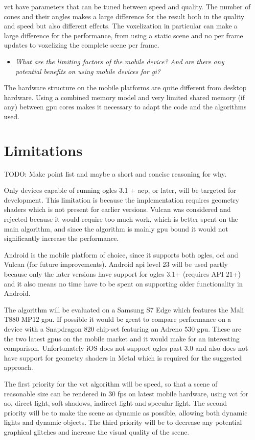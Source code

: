 \gls{vct} have parameters that can be tuned between speed and quality. 
The number of cones and their angles makes a large difference for the result both in the quality and speed but also different effects. 
The voxelization in particular can make a large difference for the performance, from using a static scene and no per frame updates to voxelizing the complete scene per frame.

\begin{itemize}
  \item \textit{What are the limiting factors of the mobile device? And are there any potential benefits on using mobile devices for \gls{gi}?}
\end{itemize}

The hardware structure on the mobile platforms are quite different from desktop hardware. 
Using a combined memory model and very limited shared memory (if any) between \gls{gpu} cores makes it necessary to adapt the code and the algorithms used.

\section{Limitations}

TODO: Make point list and maybe a short and concise reasoning for why.

Only devices capable of running \gls{ogles} 3.1 + \gls{aep}, or later, will be targeted for development. This limitation is because the implementation requires geometry shaders which is not present for earlier versions. 
Vulcan was considered and rejected because it would require too much work, which is better spent on the main algorithm, and since the algorithm is mainly \gls{gpu} bound it would not significantly increase the performance.

Android is the mobile platform of choice, since it supports both \gls{ogles}, \gls{ocl} and Vulcan (for future improvements). 
Android \acrshort{api} level 23 will be used partly because only the later versions have support for \gls{ogles} 3.1+ (requires API 21+) and it also means no time have to be spent on supporting older functionality in Android.

The algorithm will be evaluated on a Samsung S7 Edge which features the Mali T880 MP12 \gls{gpu}. 
If possible it would be great to compare performance on a device with a Snapdragon 820 chip-set featuring an Adreno 530 \gls{gpu}. These are the two latest \glspl{gpu} on the mobile market and it would make for an interesting comparison. 
Unfortunately iOS does not support \gls{ogles} past 3.0 and also does not have support for geometry shaders in Metal which is required for the suggested approach.

The first priority for the \gls{vct} algorithm will be speed, so that a scene of reasonable size can be rendered in 30 fps on latest mobile hardware, using \gls{vct} for \gls{ao}, direct light, soft shadows, indirect light and specular light. 
The second priority will be to make the scene as dynamic as possible, allowing both dynamic lights and dynamic objects. 
The third priority will be to decrease any potential graphical glitches and increase the visual quality of the scene. 
